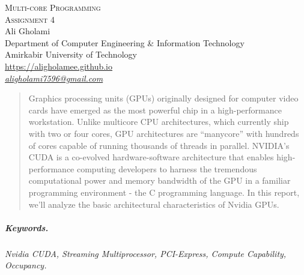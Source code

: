 \documentclass[12pt]{article}
\numberwithin{equation}{section}
\numberwithin{table}{section}
\numberwithin{figure}{section}
\begin{document}

\begin{center}
\textsc{\Huge Multi-core Programming} \\[2pt]
	\textsc{\Large Assignment 4}\\
	\vspace{0.5cm}
  Ali Gholami \\[6pt]
  Department of Computer Engineering \& Information Technology\\
  Amirkabir University of Technology  \\[6pt]
  \def\UrlFont{\em}
  \url{https://aligholamee.github.io}\\
\href{mailto:aligholami7596@gmail.com}{\textit{aligholami7596@gmail.com}}
\end{center}

\begin{abstract}
Graphics processing units (GPUs) originally designed for computer video cards have emerged as the most powerful chip in a high-performance workstation. Unlike multicore CPU architectures, which currently ship with two or four cores, GPU architectures are “manycore” with hundreds of cores capable of running thousands of threads in parallel. NVIDIA’s CUDA is a co-evolved hardware-software architecture that enables high-performance computing developers to harness the tremendous computational power and memory bandwidth of the GPU in a familiar programming environment - the C programming language. In this report, we'll analyze the basic architectural characteristics of Nvidia GPUs.
\end{abstract} 

\subparagraph{Keywords.} \textit{Nvidia CUDA, Streaming Multiprocessor, PCI-Express, Compute Capability, Occupancy.}
\end{document}
